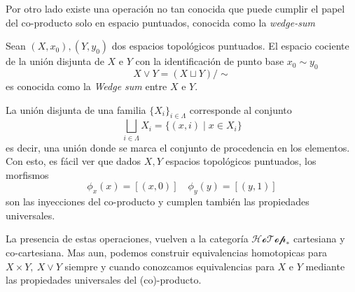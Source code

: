 Por otro lado existe una operación no tan conocida que puede cumplir el papel
del co-producto solo en espacio puntuados, conocida como la \emph{wedge-sum}
\begin{definicion}
  Sean \((X, x_0),(Y, y_0)\) dos espacios topológicos puntuados. El
  espacio cociente de la unión disjunta de \(X\) e \(Y\) con la
  identificación de punto base \(x_0 \sim y_0\)
  \[ X \vee Y = (X \sqcup Y) / \sim \]
  es conocida como la \emph{Wedge sum} entre \(X\) e \(Y\).
\end{definicion}
La unión disjunta de una familia \(\{X_i\}_{i \in \Lambda}\) corresponde
al conjunto
\[ \bigsqcup_{i \in \Lambda} X_i = \{ (x, i) \mid x \in X_i \} \]
es decir, una unión donde se marca el conjunto de procedencia en los
elementos. Con esto, es fácil ver que dados \(X, Y\) espacios topológicos
puntuados, los morfismos
\[ \phi_x (x) = [(x,0)] \quad \phi_y (y) = [(y,1)] \]
son las inyecciones del co-producto y cumplen también las propiedades
universales.

La presencia de estas operaciones, vuelven a la categoría
\(\mathscr{HoTop}_*\) cartesiana y co-cartesiana. Mas aun, podemos
construir equivalencias homotopicas para \(X \times Y,\ X \vee Y\)
siempre y cuando conozcamos equivalencias para \(X\) e \(Y\) mediante
las propiedades universales del (co)-producto.

